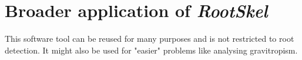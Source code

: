 \section{Broader application of \textit{RootSkel}}

This software tool can be reused for many purposes and is not restricted to root detection.
It might also be used for "easier" problems like analysing gravitropism.

